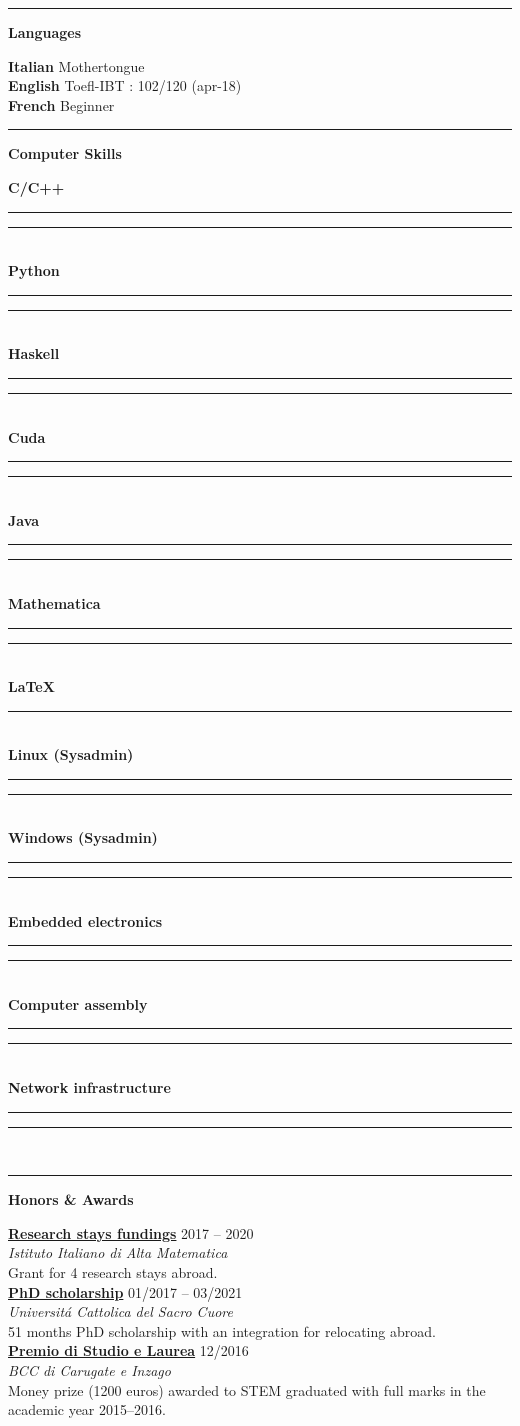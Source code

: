 \documentclass[a4paper]{article}
\newcommand{\crule}[3][black]{\textcolor{#1}{\rule{#2}{#3}}}
\newcommand{\progbar}[4][black]{\crule[#1]{#3}{#4}\crule[#1!10!white!90]{#2}{#4}}
\newcommand{\block}[1]{\hrule \vspace{0.2cm} \textbf{\Large #1} \vspace{0.2cm}}
\newcommand{\voice}[5]{\href{#4}{\textbf{#1}} \hfill #2 \\ \textit{#3} \\ {\small #5} \vspace{0.2cm} \\}
\newcommand{\skill}[2]{\textbf{#1} \hfill #2 \\}
\newcommand{\skillbar}[4]{\textbf{#1} \hfill \progbar{#2}{#3}{#4} \\}
\begin{document}
\hfill
\begin{minipage}[t]{0.375\columnwidth}
    

    \block{Languages} 
    
    
    \skill{Italian}{Mothertongue}
    \skill{English}{Toefl-IBT : 102/120 (apr-18)}
    \skill{French}{Beginner}
        





    \block{Computer Skills} 
    
    
    \skillbar{C/C++}
    {1cm}
    {1cm}
    {0.25cm}
    \skillbar{Python}
    {1cm}
    {1cm}
    {0.25cm}
    \skillbar{Haskell}
    {1.5cm}
    {0.5cm}
    {0.25cm}
    \skillbar{Cuda}
    {.75cm}
    {1.25cm}
    {0.25cm}
    \skillbar{Java}
    {.75cm}
    {1.25cm}
    {0.25cm}
    \skillbar{Mathematica}
    {1.5cm}
    {0.5cm}
    {0.25cm}
    \skillbar{\LaTeX}
    {0cm}
    {2cm}
    {0.25cm}
    \skillbar{Linux (Sysadmin)}
    {0.5cm}
    {1.5cm}
    {0.25cm}
    \skillbar{Windows (Sysadmin)}
    {0.5cm}
    {1.5cm}
    {0.25cm}
    \skillbar{Embedded electronics}
    {1.5cm}
    {0.5cm}
    {0.25cm}
    \skillbar{Computer assembly}
    {1.0cm}
    {1.0cm}
    {0.25cm}
    \skillbar{Network infrastructure}
    {1.5cm}
    {0.5cm}
    {0.25cm}





    \block{Honors \& Awards}
    
    \voice{Research stays fundings}
    		{2017 -- 2020}
    		{Istituto Italiano di Alta Matematica}
    		{https://www.altamatematica.it/gnsaga/attivita/partecipazione-a-convegni-scuole-e-workshop-missioni/}
    		{Grant for 4 research stays abroad.}
    \voice{PhD scholarship}
        {01/2017 -- 03/2021}
        {Universit\'a Cattolica del Sacro Cuore}
        {https://www.dropbox.com/s/pmsg20xsxd6x5yf/External_Scholarship.pdf?dl=0}       
        {51 months PhD scholarship with an integration for relocating abroad.}
    \voice{Premio di Studio e Laurea}
        {12/2016}
        {BCC di Carugate e Inzago}
        {https://web.archive.org/web/20191207203437/https://www.bccmilano.it/news/dettaglio_news_div.asp?i_menuID=54872&hNewsID=132411}       
        {Money prize (1200 euros) awarded to STEM graduated with full marks in the academic year 2015--2016.}




    









\end{minipage}
\end{document}

